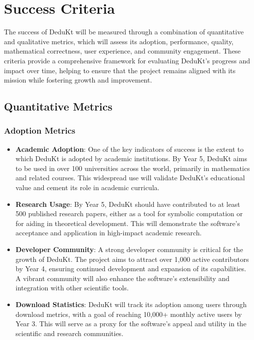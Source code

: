 \section{Success Criteria}\label{sec:success-criteria}

The success of DeduKt will be measured through a combination of quantitative and qualitative metrics, which will assess its adoption, performance, quality, mathematical correctness, user experience, and community engagement.
These criteria provide a comprehensive framework for evaluating DeduKt’s progress and impact over time, helping to ensure that the project remains aligned with its mission while fostering growth and improvement.

\subsection{Quantitative Metrics}\label{subsec:quantitative-metrics}

\subsubsection{Adoption Metrics}

\begin{itemize}
    \item \textbf{Academic Adoption}: One of the key indicators of success is the extent to which DeduKt is adopted by academic institutions.
    By Year 5, DeduKt aims to be used in over 100 universities across the world, primarily in mathematics and related courses.
    This widespread use will validate DeduKt’s educational value and cement its role in academic curricula.

    \item \textbf{Research Usage}: By Year 5, DeduKt should have contributed to at least 500 published research papers, either as a tool for symbolic computation or for aiding in theoretical development.
    This will demonstrate the software’s acceptance and application in high-impact academic research.

    \item \textbf{Developer Community}: A strong developer community is critical for the growth of DeduKt.
    The project aims to attract over 1,000 active contributors by Year 4, ensuring continued development and expansion of its capabilities.
    A vibrant community will also enhance the software’s extensibility and integration with other scientific tools.

    \item \textbf{Download Statistics}: DeduKt will track its adoption among users through download metrics, with a goal of reaching 10,000+ monthly active users by Year 3.
    This will serve as a proxy for the software’s appeal and utility in the scientific and research communities.
\end{itemize}

